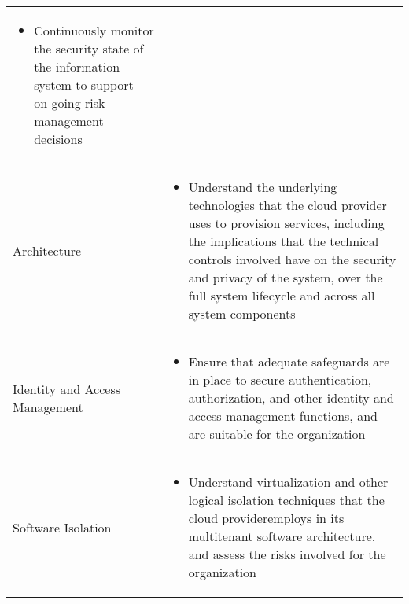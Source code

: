 \begin{table}[h]
\begin{tabular}{p{3cm} | p{12cm}}
\begin{itemize}
            \item Continuously monitor the security state of the information system to support on-going risk management decisions
        \end{itemize}\\
        Architecture &
        \begin{itemize}
            \item Understand the underlying technologies that the cloud provider uses to provision services, including the implications that the technical controls involved have on the security and privacy of the system, over the full system lifecycle and across all system components
        \end{itemize}\\
        Identity and Access Management &
        \begin{itemize}
            \item Ensure that adequate safeguards are in place to secure authentication, authorization, and other identity and access management functions, and are suitable for the organization
        \end{itemize}\\
        Software Isolation &
        \begin{itemize}
            \item Understand virtualization and other logical isolation techniques that the cloud provideremploys in its multitenant software architecture, and assess the risks involved for the organization
        \end{itemize}
    \end{tabular}
\end{table}

